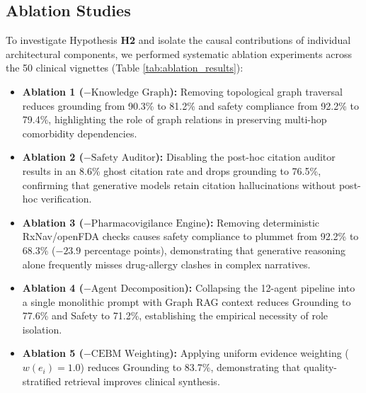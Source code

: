 \documentclass[journal,10pt,twocolumn]{IEEEtran}
\begin{document}
\subsection{Ablation Studies}
To investigate Hypothesis \textbf{H2} and isolate the causal contributions of individual architectural components, we performed systematic ablation experiments across the 50 clinical vignettes (Table \ref{tab:ablation_results}):
\begin{itemize}
    \item \textbf{Ablation 1 ($- \text{Knowledge Graph}$):} Removing topological graph traversal reduces grounding from 90.3\% to 81.2\% and safety compliance from 92.2\% to 79.4\%, highlighting the role of graph relations in preserving multi-hop comorbidity dependencies.
    \item \textbf{Ablation 2 ($- \text{Safety Auditor}$):} Disabling the post-hoc citation auditor results in an 8.6\% ghost citation rate and drops grounding to 76.5\%, confirming that generative models retain citation hallucinations without post-hoc verification.
    \item \textbf{Ablation 3 ($- \text{Pharmacovigilance Engine}$):} Removing deterministic RxNav/openFDA checks causes safety compliance to plummet from 92.2\% to 68.3\% ($-23.9$ percentage points), demonstrating that generative reasoning alone frequently misses drug-allergy clashes in complex narratives.
    \item \textbf{Ablation 4 ($- \text{Agent Decomposition}$):} Collapsing the 12-agent pipeline into a single monolithic prompt with Graph RAG context reduces Grounding to 77.6\% and Safety to 71.2\%, establishing the empirical necessity of role isolation.
    \item \textbf{Ablation 5 ($- \text{CEBM Weighting}$):} Applying uniform evidence weighting ($w(e_i)=1.0$) reduces Grounding to 83.7\%, demonstrating that quality-stratified retrieval improves clinical synthesis.
\end{itemize}
\end{document}
